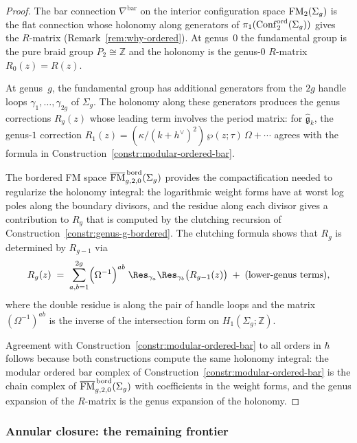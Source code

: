 \begin{proof}
The bar connection $\nabla^{\mathrm{bar}}$ on the interior
configuration space $\mathrm{FM}_2(\Sigma_g)$ is the flat connection
whose holonomy along generators of
$\pi_1(\mathrm{Conf}_2^{\mathrm{ord}}(\Sigma_g))$ gives the
$R$-matrix (Remark~\ref{rem:why-ordered}). At genus~$0$
the fundamental group is the pure braid group $P_2\cong\mathbb Z$
and the holonomy is the genus-$0$ $R$-matrix $R_0(z)=R(z)$.

At genus~$g$, the fundamental group has additional generators
from the $2g$ handle loops $\gamma_1,\dotsc,\gamma_{2g}$ of
$\Sigma_g$. The holonomy along these generators produces the
genus corrections $R_g(z)$ whose leading term involves the
period matrix:
for $\widehat{\mathfrak g}_k$, the genus-$1$ correction
$R_1(z)=(\kappa/(k+h^\vee)^2)\,\wp(z;\tau)\,\Omega+\cdots$
agrees with the formula in
Construction~\ref{constr:modular-ordered-bar}.

The bordered FM space
$\overline{\mathrm{FM}}^{\,\mathrm{bord}}_{g,2,0}(\Sigma_g)$ provides the
compactification needed to regularize the holonomy integral:
the logarithmic weight forms have at worst log poles along the
boundary divisors, and the residue along each divisor gives a
contribution to $R_g$ that is computed by the clutching recursion
of Construction~\ref{constr:genus-g-bordered}. The clutching
formula shows that $R_g$ is determined by $R_{g-1}$ via
\[
R_g(z)
\;=\;
\sum_{a,b=1}^{2g}
\Bigl(\Omega^{-1}\Bigr)^{ab}\;
\Res_{\gamma_a}\Res_{\gamma_b}
\bigl(R_{g-1}(z)\bigr)
\;+\;
(\text{lower-genus terms}),
\]
where the double residue is along the pair of handle loops and the
matrix $(\Omega^{-1})^{ab}$ is the inverse of the intersection
form on $H_1(\Sigma_g;\mathbb Z)$.

Agreement with Construction~\ref{constr:modular-ordered-bar} to all
orders in $\hbar$ follows because both constructions compute the
same holonomy integral: the modular ordered bar complex of
Construction~\ref{constr:modular-ordered-bar} is the chain
complex of $\overline{\mathrm{FM}}^{\,\mathrm{bord}}_{g,2,0}(\Sigma_g)$
with coefficients in the weight forms, and the genus expansion
of the $R$-matrix is the genus expansion of the holonomy.
\end{proof}

\subsubsection{Annular closure: the remaining frontier}


